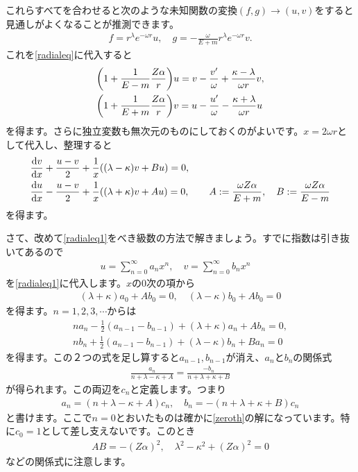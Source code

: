 \documentclass[report,paper=a4, fontsize=12pt, line_length=16cm, number_of_lines=33,dvipdfmx]{jlreq}
\numberwithin{equation}{chapter}
\begin{document}
これらすべてを合わせると次のような未知関数の変換$(f,g)\to(u,v)$をすると見通しがよくなることが推測できます。
\begin{align}
  f=r^{\lambda}e^{-\omega r}u,\quad
  g=-\frac{\omega}{E+m}r^{\lambda}e^{-\omega r}v.
  \label{defuv}
\end{align}
これを\eqref{radialeq}に代入すると
\begin{align}
  &\qty(1+\frac{1}{E-m}\frac{Z\alpha}{r})u=v-\frac{v'}{\omega}+\frac{\kappa-\lambda}{\omega r}v,\\
  &\qty(1+\frac{1}{E+m}\frac{Z\alpha}{r})v=u-\frac{u'}{\omega}-\frac{\kappa+\lambda}{\omega r}u
\end{align}
を得ます。さらに独立変数も無次元のものにしておくのがよいです。$x=2\omega r$として代入し、整理すると
\begin{align}
  &\dv{v}{x}+\frac{u-v}{2}+\frac{1}{x}\qty((\lambda-\kappa)v+Bu)=0,\\
  &\dv{u}{x}-\frac{u-v}{2}+\frac{1}{x}\qty((\lambda+\kappa)v+Au)=0,\qquad
  A:=\frac{\omega Z\alpha}{E+m},\quad B:=\frac{\omega Z\alpha}{E-m}
  \label{radialeq1}
\end{align}
を得ます。

さて、改めて\eqref{radialeq1}をべき級数の方法で解きましょう。すでに指数は引き抜いてあるので
\begin{align}
  u=\sum_{n=0}^{\infty}a_{n}x^n,\quad
  v=\sum_{n=0}^{\infty}b_{n}x^n\quad
\end{align}
を\eqref{radialeq1}に代入します。$x$の$0$次の項から
\begin{align}
  (\lambda+\kappa)a_0+Ab_0=0,\quad
  (\lambda-\kappa)b_0+Ab_0=0\label{zeroth}
\end{align}
を得ます。$n=1,2,3,\cdots$からは
\begin{align}
  na_n-\frac12(a_{n-1}-b_{n-1})+(\lambda+\kappa)a_n + A b_n=0,\\
  nb_n+\frac12(a_{n-1}-b_{n-1})+(\lambda-\kappa)b_n + B a_n=0
  \label{higher}
\end{align}
を得ます。この２つの式を足し算すると$a_{n-1},b_{n-1}$が消え、$a_n$と$b_n$の関係式
\begin{align}
  \frac{a_n}{n+\lambda-\kappa+A}=\frac{-b_n}{n+\lambda+\kappa+B}
\end{align}
が得られます。この両辺を$c_n$と定義します。つまり
\begin{align}
  a_{n}=(n+\lambda-\kappa+A)c_n,\quad
  b_{n}=-(n+\lambda+\kappa+B)c_n
  \label{cn}
\end{align}
と書けます。ここで$n=0$とおいたものは確かに\eqref{zeroth}の解になっています。特に$c_0=1$として差し支えないです。このとき
\begin{align}
  AB=-(Z\alpha)^2,\quad \lambda^2-\kappa^2+(Z\alpha)^2=0
\end{align}
などの関係式に注意します。
\end{document}
